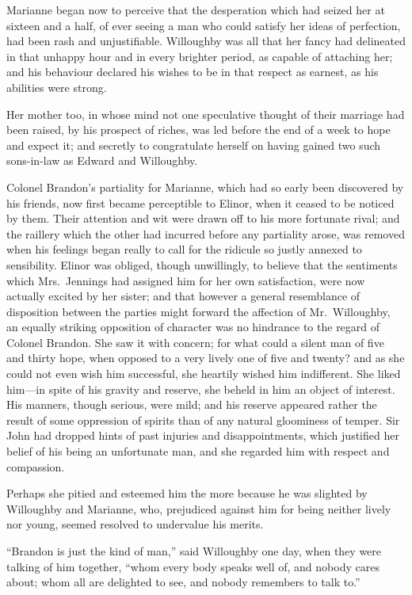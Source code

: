 Marianne began now to perceive that the desperation
which had seized her at sixteen and a half, of ever
seeing a man who could satisfy her ideas of perfection,
had been rash and unjustifiable.  Willoughby was all
that her fancy had delineated in that unhappy hour
and in every brighter period, as capable of attaching her;
and his behaviour declared his wishes to be in that respect
as earnest, as his abilities were strong.

Her mother too, in whose mind not one speculative
thought of their marriage had been raised, by his prospect
of riches, was led before the end of a week to hope and
expect it; and secretly to congratulate herself on having
gained two such sons-in-law as Edward and Willoughby.

Colonel Brandon's partiality for Marianne, which had
so early been discovered by his friends, now first became
perceptible to Elinor, when it ceased to be noticed
by them.  Their attention and wit were drawn off to his
more fortunate rival; and the raillery which the other
had incurred before any partiality arose, was removed
when his feelings began really to call for the ridicule
so justly annexed to sensibility.  Elinor was obliged,
though unwillingly, to believe that the sentiments which
Mrs.\ Jennings had assigned him for her own satisfaction,
were now actually excited by her sister; and that however
a general resemblance of disposition between the parties
might forward the affection of Mr.\ Willoughby, an equally
striking opposition of character was no hindrance to the
regard of Colonel Brandon.  She saw it with concern;
for what could a silent man of five and thirty hope,
when opposed to a very lively one of five and twenty? and as
she could not even wish him successful, she heartily wished
him indifferent.  She liked him---in spite of his gravity
and reserve, she beheld in him an object of interest.
His manners, though serious, were mild; and his reserve
appeared rather the result of some oppression of spirits
than of any natural gloominess of temper.  Sir John
had dropped hints of past injuries and disappointments,
which justified her belief of his being an unfortunate man,
and she regarded him with respect and compassion.

Perhaps she pitied and esteemed him the more
because he was slighted by Willoughby and Marianne,
who, prejudiced against him for being neither lively
nor young, seemed resolved to undervalue his merits.

``Brandon is just the kind of man,'' said Willoughby
one day, when they were talking of him together,
``whom every body speaks well of, and nobody cares about;
whom all are delighted to see, and nobody remembers
to talk to.''

